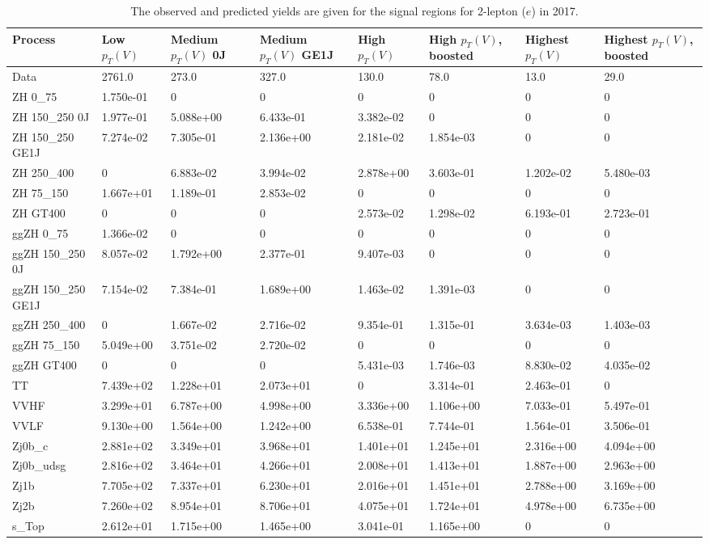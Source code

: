 \begin{table}
\centering
\caption[2017 2-lepton ($e$) signal selection yields]{
                  The observed and predicted yields are given for the
                  signal regions for 2-lepton ($e$) in 2017.
                  }
{\footnotesize
\begin{tabularx}{\textwidth}{|X|X|X|X|X|X|X|X|}
\hline
Process & Low $p_{T}(V)$ & Medium $p_{T}(V)$ 0J & Medium $p_{T}(V)$ GE1J & High $p_{T}(V)$ & High $p_{T}(V)$, boosted & Highest $p_{T}(V)$ & Highest $p_{T}(V)$, boosted \\
\hline
Data & 2761.0 & 273.0 & 327.0 & 130.0 & 78.0 & 13.0 & 29.0 \\
\hline
ZH 0\_75 & 1.750e-01 & 0 & 0 & 0 & 0 & 0 & 0 \\
ZH 150\_250 0J & 1.977e-01 & 5.088e+00 & 6.433e-01 & 3.382e-02 & 0 & 0 & 0 \\
ZH 150\_250 GE1J & 7.274e-02 & 7.305e-01 & 2.136e+00 & 2.181e-02 & 1.854e-03 & 0 & 0 \\
ZH 250\_400 & 0 & 6.883e-02 & 3.994e-02 & 2.878e+00 & 3.603e-01 & 1.202e-02 & 5.480e-03 \\
ZH 75\_150 & 1.667e+01 & 1.189e-01 & 2.853e-02 & 0 & 0 & 0 & 0 \\
ZH GT400 & 0 & 0 & 0 & 2.573e-02 & 1.298e-02 & 6.193e-01 & 2.723e-01 \\
ggZH 0\_75 & 1.366e-02 & 0 & 0 & 0 & 0 & 0 & 0 \\
ggZH 150\_250 0J & 8.057e-02 & 1.792e+00 & 2.377e-01 & 9.407e-03 & 0 & 0 & 0 \\
ggZH 150\_250 GE1J & 7.154e-02 & 7.384e-01 & 1.689e+00 & 1.463e-02 & 1.391e-03 & 0 & 0 \\
ggZH 250\_400 & 0 & 1.667e-02 & 2.716e-02 & 9.354e-01 & 1.315e-01 & 3.634e-03 & 1.403e-03 \\
ggZH 75\_150 & 5.049e+00 & 3.751e-02 & 2.720e-02 & 0 & 0 & 0 & 0 \\
ggZH GT400 & 0 & 0 & 0 & 5.431e-03 & 1.746e-03 & 8.830e-02 & 4.035e-02 \\
\hline
TT & 7.439e+02 & 1.228e+01 & 2.073e+01 & 0 & 3.314e-01 & 2.463e-01 & 0 \\
VVHF & 3.299e+01 & 6.787e+00 & 4.998e+00 & 3.336e+00 & 1.106e+00 & 7.033e-01 & 5.497e-01 \\
VVLF & 9.130e+00 & 1.564e+00 & 1.242e+00 & 6.538e-01 & 7.744e-01 & 1.564e-01 & 3.506e-01 \\
Zj0b\_c & 2.881e+02 & 3.349e+01 & 3.968e+01 & 1.401e+01 & 1.245e+01 & 2.316e+00 & 4.094e+00 \\
Zj0b\_udsg & 2.816e+02 & 3.464e+01 & 4.266e+01 & 2.008e+01 & 1.413e+01 & 1.887e+00 & 2.963e+00 \\
Zj1b & 7.705e+02 & 7.337e+01 & 6.230e+01 & 2.016e+01 & 1.451e+01 & 2.788e+00 & 3.169e+00 \\
Zj2b & 7.260e+02 & 8.954e+01 & 8.706e+01 & 4.075e+01 & 1.724e+01 & 4.978e+00 & 6.735e+00 \\
s\_Top & 2.612e+01 & 1.715e+00 & 1.465e+00 & 3.041e-01 & 1.165e+00 & 0 & 0 \\
\hline
\end{tabularx}
}
\label{tab:sr-Zee-2017}
\end{table}

